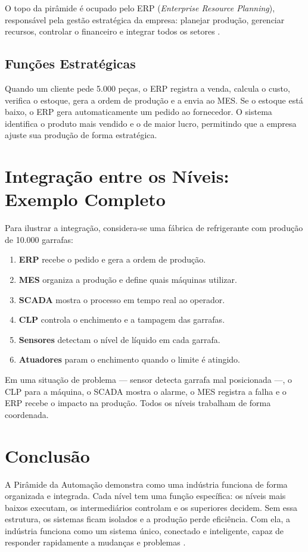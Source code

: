 \documentclass[12pt,a4paper,oneside]{article}
\begin{document}
O topo da pirâmide é ocupado pelo ERP (\textit{Enterprise Resource Planning}), responsável pela gestão estratégica da empresa: planejar produção, gerenciar recursos, controlar o financeiro e integrar todos os setores \cite{santos2024}.

\subsection{Funções Estratégicas}

Quando um cliente pede 5.000 peças, o ERP registra a venda, calcula o custo, verifica o estoque, gera a ordem de produção e a envia ao MES. Se o estoque está baixo, o ERP gera automaticamente um pedido ao fornecedor. O sistema identifica o produto mais vendido e o de maior lucro, permitindo que a empresa ajuste sua produção de forma estratégica.

\section{Integração entre os Níveis: Exemplo Completo}

Para ilustrar a integração, considera-se uma fábrica de refrigerante com produção de 10.000 garrafas:

\begin{enumerate}
  \item \textbf{ERP} recebe o pedido e gera a ordem de produção.
  \item \textbf{MES} organiza a produção e define quais máquinas utilizar.
  \item \textbf{SCADA} mostra o processo em tempo real ao operador.
  \item \textbf{CLP} controla o enchimento e a tampagem das garrafas.
  \item \textbf{Sensores} detectam o nível de líquido em cada garrafa.
  \item \textbf{Atuadores} param o enchimento quando o limite é atingido.
\end{enumerate}

Em uma situação de problema --- sensor detecta garrafa mal posicionada ---, o CLP para a máquina, o SCADA mostra o alarme, o MES registra a falha e o ERP recebe o impacto na produção. Todos os níveis trabalham de forma coordenada.

\section{Conclusão}

A Pirâmide da Automação demonstra como uma indústria funciona de forma organizada e integrada. Cada nível tem uma função específica: os níveis mais baixos executam, os intermediários controlam e os superiores decidem. Sem essa estrutura, os sistemas ficam isolados e a produção perde eficiência. Com ela, a indústria funciona como um sistema único, conectado e inteligente, capaz de responder rapidamente a mudanças e problemas \cite{schwab2016}.



\end{document}
